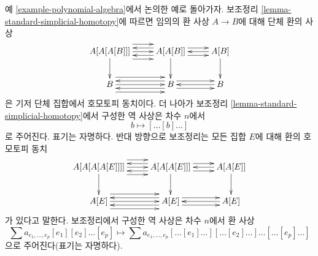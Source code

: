 \begin{example}
\label{example-polynomial-algebra-homotopy}
예 \ref{example-polynomial-algebra}에서 논의한 예로 돌아가자. 보조정리
\ref{lemma-standard-simplicial-homotopy}에 따르면 임의의 환 사상
$A \to B$에 대해 단체 환의 사상
$$
\xymatrix{
A[A[A[B]]] \ar[d]
\ar@<2ex>[r]
\ar@<0ex>[r]
\ar@<-2ex>[r]
&
A[A[B]] \ar[d]
\ar@<1ex>[r]
\ar@<-1ex>[r]
\ar@<1ex>[l]
\ar@<-1ex>[l]
&
A[B] \ar[d]
\ar@<0ex>[l] \\
B
\ar@<2ex>[r]
\ar@<0ex>[r]
\ar@<-2ex>[r]
&
B
\ar@<1ex>[r]
\ar@<-1ex>[r]
\ar@<1ex>[l]
\ar@<-1ex>[l]
&
B
\ar@<0ex>[l]
}
$$
은 기저 단체 집합에서 호모토피 동치이다. 더 나아가 보조정리
\ref{lemma-standard-simplicial-homotopy}에서 구성한 역 사상은 차수
$n$에서
$$
b \longmapsto [\ldots[b]\ldots]
$$
로 주어진다. 표기는 자명하다. 반대 방향으로 보조정리는 모든 집합
$E$에 대해 환의 호모토피 동치
$$
\xymatrix{
A[A[A[A[E]]]] \ar[d]
\ar@<2ex>[r]
\ar@<0ex>[r]
\ar@<-2ex>[r]
&
A[A[A[E]]] \ar[d]
\ar@<1ex>[r]
\ar@<-1ex>[r]
\ar@<1ex>[l]
\ar@<-1ex>[l]
&
A[A[E]] \ar[d]
\ar@<0ex>[l] \\
A[E]
\ar@<2ex>[r]
\ar@<0ex>[r]
\ar@<-2ex>[r]
&
A[E]
\ar@<1ex>[r]
\ar@<-1ex>[r]
\ar@<1ex>[l]
\ar@<-1ex>[l]
&
A[E]
\ar@<0ex>[l]
}
$$
가 있다고 말한다. 보조정리에서 구성한 역 사상은 차수 $n$에서 환 사상
$$
\sum a_{e_1,\ldots,e_p}[e_1][e_2] \ldots [e_p]
\longmapsto
\sum a_{e_1,\ldots,e_p}[\ldots[e_1]\ldots][\ldots[e_2]\ldots]
\ldots [\ldots[e_p]\ldots]
$$
으로 주어진다(표기는 자명하다).
\end{example}
















